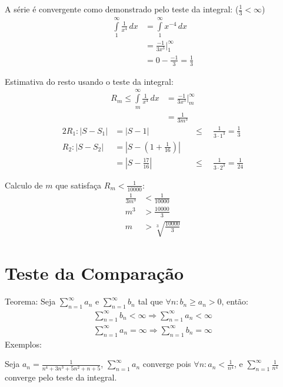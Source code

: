 \documentclass{article}
\begin{document}
A s\'erie \'e convergente como demonstrado pelo teste da integral: ($\frac{1}{3} < \infty$)
\begin{align*}
  \int\limits_1^\infty \frac{1}{x^4}\,dx &= \int\limits_1^\infty x^{-4}\,dx \\[5pt]
  &= \frac{-1}{3x^3}\bigg|_1^\infty \\[5pt]
  &= 0 - \frac{-1}{3} = \frac{1}{3}
\end{align*}

Estimativa do resto usando o teste da integral:
\begin{align*}
  R_m \leq \int\limits_m^\infty \frac{1}{x^4}\,dx &= \frac{-1}{3x^3} \bigg|_m^\infty \\
  &=\frac{1}{3m^3}
\end{align*}
\begin{alignat*}{2}
  R_1: |S - S_1| &= |S - 1| \hspace{35pt}&& \leq \quad \frac{1}{3 \cdot 1^3} = \frac{1}{3} \\[10pt]
  R_2: |S - S_2| &= |S - (1 + \frac{1}{16})| \\
  &= |S - \frac{17}{16}| \hspace{35pt}&& \leq \quad \frac{1}{3 \cdot 2^3} = \frac{1}{24}
\end{alignat*}

Calculo de $m$ que satisfa\c{c}a $R_m < \frac{1}{10000}$:
\begin{align*}
  \frac{1}{3m^3} &< \frac{1}{10000} \\[10pt]
  m^3 &> \frac{10000}{3} \\[10pt]
  m\phantom{^3} &> \sqrt[3]{\frac{10000}{3}}
\end{align*}



\section{Teste da Compara\c{c}\~ao}

Teorema: Seja $\sum\limits_{n=1}^\infty a_n$ e $\sum\limits_{n=1}^\infty b_n$ tal que $\forall n: b_n \geq a_n > 0$, ent\~ao:
\begin{gather*}
  \sum\limits_{n=1}^\infty b_n < \infty \Rightarrow \sum\limits_{n=1}^\infty a_n < \infty \\
  \sum\limits_{n=1}^\infty a_n = \infty \Rightarrow \sum\limits_{n=1}^\infty b_n = \infty
\end{gather*}
Exemplos:

Seja $a_n = \frac{1}{n^4 + 3n^3 + 5n^2 + n + 5}$, $\sum\limits_{n=1}^\infty a_n$ converge pois $\forall n: a_n < \frac{1}{n^4}$, e $\sum\limits_{n=1}^\infty \frac{1}{n^4}$ converge pelo teste da integral. \\
\end{document}
